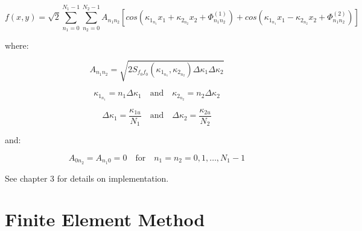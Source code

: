 \begin{equation}
\label{eq114}
	f(x,y) = \sqrt{2}\sum_{n_1=0}^{N_1-1} \sum_{n_2=0}^{N_2-1} A_{n_1 n_2} [cos(\kappa_{1_{n_1}} x_1 + \kappa_{2_{n_2}} x_2 + \Phi_{n_1 n_2}^{(1)}) + cos(\kappa_{1_{n_1}} x_1 - \kappa_{2_{n_2}} x_2 + \Phi_{n_1 n_2}^{(2)}) ]
\end{equation}

where:

\begin{equation}
\label{eq45}
	A_{n_1 n_2} = \sqrt{2S_{f_0 f_0}(\kappa_{1_{n_1}},\kappa_{2_{n_2}})\Delta\kappa_1\Delta\kappa_2}
\end{equation}

\begin{equation}
\label{eq47}
	\kappa_{1_{n_1}} = n_1 \Delta\kappa_1 \quad\text{and}\quad \kappa_{2_{n_2}} = n_2 \Delta\kappa_2
\end{equation}

\begin{equation}
\label{eq48}
	\Delta\kappa_1 = \frac{\kappa_{1u}}{N_1} \quad\text{and}\quad \Delta\kappa_2 = \frac{\kappa_{2u}}{N_2} 
\end{equation}

and:

\begin{equation}
\label{eq49}
	A_{{0}n_2} = A_{{n_1}0} = 0 \quad\text{for}\quad n_1 = n_2 = 0,1,\dots,N_1-1
\end{equation}



See chapter 3 for details on implementation.

\section{Finite Element Method}






